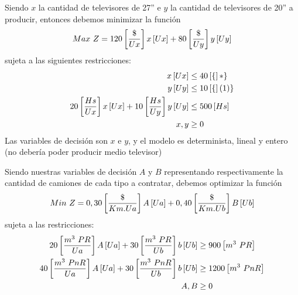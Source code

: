 \documentclass{tarea}
\begin{document}
\begin{homeworkProblem}[-1][Televisores]
Siendo $x$ la cantidad de televisores de 27'' e $y$ la cantidad de televisores de 20'' a producir, entonces debemos minimizar la función\\
\begin{equation}
Max\ Z=120\left[ \frac{\$}{Ux} \right] x\left[ Ux \right] +80\left[ \frac{\$}{Uy} \right]y\left[ Uy \right] 
\end{equation}
sujeta a las siguientes restricciones:
\begin{align*}
x  \left[ Ux  \right] & \le 40\left[ \{ \right]*\} \\
y\left[ Uy \right] & \le 10\left[ \{ \right](1)\} \\
20\left[ \frac{Hs}{Ux} \right]x\left[ Ux \right] + 10\left[ \frac{Hs}{Uy} \right]y\left[ Uy  \right] & \le 500\left[ Hs \right] \\
x,y & \ge 0
\end{align*}
Las variables de decisión son $x$ e $y$, y el modelo es determinista, lineal y entero (no debería poder producir medio televisor)
\end{homeworkProblem}


\begin{homeworkProblem}[-1][Transportes]
Siendo nuestras variables de decisión $A$ y $B$ representando respectivamente la cantidad de camiones de cada tipo a contratar, debemos  optimizar la función
\begin{equation}
Min\ Z= 0,30\left[ \frac{\$}{Km.Ua} \right] A\left[ Ua \right] + 0,40\left[ \frac{\$}{Km.Ub} \right]B\left[ Ub \right] 
\end{equation}
sujeta a las restricciones:
\begin{align*}
20\fraccorche{m^3\ PR}{Ua}A\corche{Ua} + 30\fraccorche{m^3\ PR}{Ub}b\corche{Ub} &\ge 900 \corche{m^3\ PR} \\
40\fraccorche{m^3\ PnR}{Ua}A\corche{Ua} + 30\fraccorche{m^3\ PnR}{Ub}b\corche{Ub} &\ge 1200 \corche{m^3\ PnR} \\
A,B &\ge 0
\end{align*}
\end{homeworkProblem}
\end{document}
